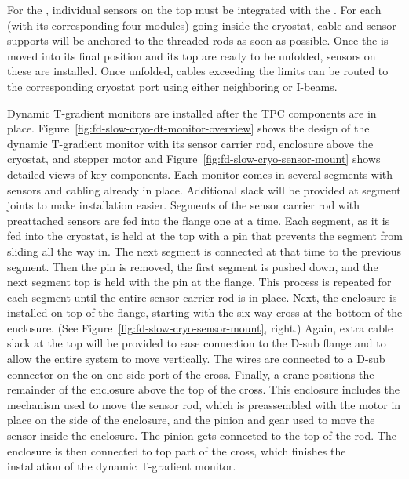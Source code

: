 For the , individual sensors on the top  must be integrated with the . For each  (with its corresponding four   modules)
going inside the cryostat, cable and sensor supports will be anchored to the   threaded rods as soon as possible.
Once the  is moved into its final position and its top  are ready to be unfolded, sensors on these  %
are installed. Once unfolded, cables 
exceeding the  limits can be routed to the corresponding cryostat port using either neighboring  or  I-beams. 



Dynamic T-gradient monitors %
are installed
after the TPC components are in place.
Figure~\ref{fig:fd-slow-cryo-dt-monitor-overview} shows the
design of the dynamic T-gradient monitor with its sensor carrier rod,
enclosure above the cryostat, and stepper motor and 
 Figure~\ref{fig:fd-slow-cryo-sensor-mount} shows detailed views of key
components.  Each monitor %
comes in several segments with sensors
and cabling already in place. Additional slack will be provided at
segment joints to make installation easier. Segments of the sensor
carrier rod with preattached sensors %
are fed into the flange one
at a time. Each segment, as it is fed into the %
cryostat, is %
held at the top with a pin that prevents the segment from sliding all
the way in. %
The next segment %
is connected at that
time to the previous segment. Then the pin %
is removed, the first
segment %
is pushed down, and the next segment top %
is held
with the pin at the flange. This process %
is repeated for each
segment %
until the entire sensor carrier rod is in
place.  Next, the enclosure %
is installed on top of the flange,
starting with the six-way cross at the bottom of the enclosure.  (See
 Figure~\ref{fig:fd-slow-cryo-sensor-mount}, right.)  Again, extra cable
slack at the top will be provided to ease connection to the D-sub
flange and to allow the entire system to move vertically.  The wires
are connected to a D-sub connector on the \fdth on one side port
of the cross. Finally, a crane %
positions the remainder
of the enclosure above the top of the cross.  This enclosure includes
the mechanism used to move the sensor rod, which %
is preassembled
with the motor in place on the side of the enclosure, and the pinion
and gear used to move the sensor inside the enclosure.  The pinion
gets connected to the top of the rod. The enclosure is then %
connected to top part of the cross, which finishes the installation of
the dynamic T-gradient monitor.

